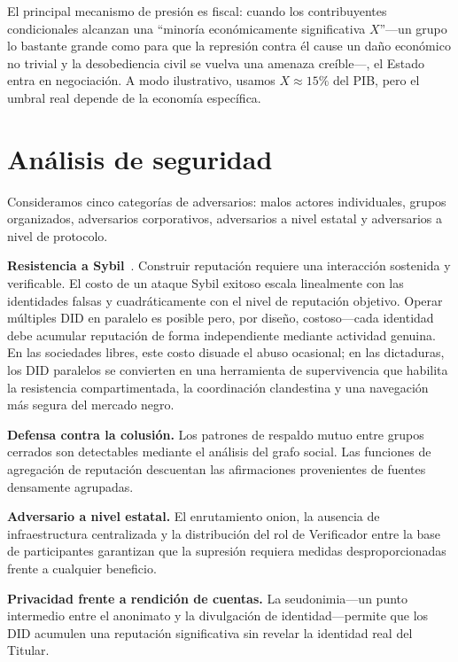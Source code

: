 \documentclass[11pt,a4paper,twocolumn]{article}
\begin{document}
El principal mecanismo de presión es fiscal: cuando los contribuyentes condicionales alcanzan una ``minoría económicamente significativa $X$''---un grupo lo bastante grande como para que la represión contra él cause un daño económico no trivial y la desobediencia civil se vuelva una amenaza creíble---, el Estado entra en negociación. A modo ilustrativo, usamos $X \approx 15\%$ del PIB, pero el umbral real depende de la economía específica.

\section{Análisis de seguridad}

Consideramos cinco categorías de adversarios: malos actores individuales, grupos organizados, adversarios corporativos, adversarios a nivel estatal y adversarios a nivel de protocolo.

\textbf{Resistencia a Sybil}~\cite{douceur2002}. Construir reputación requiere una interacción sostenida y verificable. El costo de un ataque Sybil exitoso escala linealmente con las identidades falsas y cuadráticamente con el nivel de reputación objetivo. Operar múltiples DID en paralelo es posible pero, por diseño, costoso---cada identidad debe acumular reputación de forma independiente mediante actividad genuina. En las sociedades libres, este costo disuade el abuso ocasional; en las dictaduras, los DID paralelos se convierten en una herramienta de supervivencia que habilita la resistencia compartimentada, la coordinación clandestina y una navegación más segura del mercado negro.

\textbf{Defensa contra la colusión.} Los patrones de respaldo mutuo entre grupos cerrados son detectables mediante el análisis del grafo social. Las funciones de agregación de reputación descuentan las afirmaciones provenientes de fuentes densamente agrupadas.

\textbf{Adversario a nivel estatal.} El enrutamiento onion, la ausencia de infraestructura centralizada y la distribución del rol de Verificador entre la base de participantes garantizan que la supresión requiera medidas desproporcionadas frente a cualquier beneficio.

\textbf{Privacidad frente a rendición de cuentas.} La seudonimia---un punto intermedio entre el anonimato y la divulgación de identidad---permite que los DID acumulen una reputación significativa sin revelar la identidad real del Titular.
\end{document}
